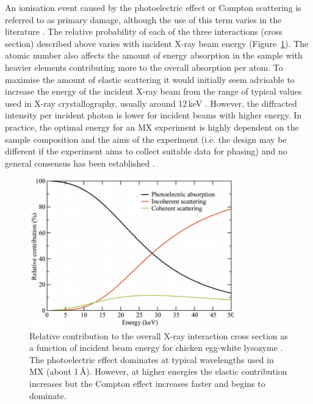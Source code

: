         An ionisation event caused by the photoelectric effect or Compton scattering is referred to as primary damage, although the use of this term varies in the literature \cite{garman2010}.
        The relative probability of each of the three interactions (cross section) described above varies with incident X-ray beam energy (Figure~\ref{fig:Relative Absorption Probabilities}).
        The atomic number also affects the amount of energy absorption in the sample with heavier elements contributing more to the overall absorption per atom.
        To maximise the amount of elastic scattering it would initially seem advisable to increase the energy of the incident X-ray beam from the range of typical values used in X-ray crystallography, usually around 12$\,$keV \cite{pait2010}.
        However, the diffracted intensity per incident photon is lower for incident beams with higher energy.
        In practice, the optimal energy for an MX experiment is highly dependent on the sample composition and the aims of the experiment (i.e. the design may be different if the experiment aims to collect suitable data for phasing) and no general consensus has been established \cite{pait2010}.
        \begin{figure}
            \centering
            \includegraphics[width=0.8\textwidth]{figures/introduction/relativeinteractions.png}
            \caption[Relative contribution to the overall X-ray interaction cross section as a function of incident beam energy for chicken egg-white lysozyme]{Relative contribution to the overall X-ray interaction cross section as a function of incident beam energy for chicken egg-white lysozyme \cite{pait2010}.
            The photoelectric effect dominates at typical wavelengths used in MX (about 1\,\AA).
            However, at higher energies the elastic contribution increases but the Compton effect increases faster and begins to dominate.}
            \label{fig:Relative Absorption Probabilities}
        \end{figure}

